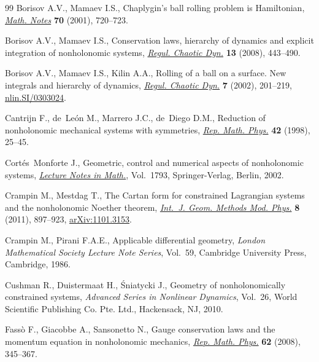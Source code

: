 \begin{thebibliography}{99}
Borisov A.V., Mamaev I.S., Chaplygin's ball rolling problem is {H}amiltonian,
  \href{http://dx.doi.org/10.1023/A:1012995330780}{\textit{Math. Notes}} \textbf{70} (2001), 720--723.

Borisov A.V., Mamaev I.S., Conservation laws, hierarchy of dynamics and
  explicit integration of nonholonomic systems, \href{http://dx.doi.org/10.1134/S1560354708050079}{\textit{Regul. Chaotic Dyn.}}
  \textbf{13} (2008), 443--490.

Borisov A.V., Mamaev I.S., Kilin A.A., Rolling of a ball on a surface. {N}ew
  integrals and hierarchy of dynamics, \href{http://dx.doi.org/10.1070/RD2002v007n02ABEH000205}{\textit{Regul. Chaotic Dyn.}} \textbf{7}
  (2002), 201--219, \href{http://arxiv.org/abs/nlin.SI/0303024}{nlin.SI/0303024}.

Cantrijn F., de~Le{\'o}n M., Marrero J.C., de~Diego D.M., Reduction of
  nonholonomic mechanical systems with symmetries, \href{http://dx.doi.org/10.1016/S0034-4877(98)80003-7}{\textit{Rep. Math. Phys.}}
  \textbf{42} (1998), 25--45.

Cort{\'e}s~Monforte J., Geometric, control and numerical aspects of
  nonholonomic systems, \href{http://dx.doi.org/10.1007/b84020}{\textit{Lecture Notes in Math.}}, Vol.~1793,
  Springer-Verlag, Berlin, 2002.

Crampin M., Mestdag T., The {C}artan form for constrained {L}agrangian systems
  and the nonholonomic {N}oether theorem, \href{http://dx.doi.org/10.1142/S0219887811005452}{\textit{Int.~J. Geom. Methods Mod.
  Phys.}} \textbf{8} (2011), 897--923, \href{http://arxiv.org/abs/1101.3153}{arXiv:1101.3153}.

Crampin M., Pirani F.A.E., Applicable dif\/ferential geometry, \textit{London
  Mathematical Society Lecture Note Series}, Vol.~59, Cambridge University
  Press, Cambridge, 1986.

Cushman R., Duistermaat H., {\'S}niatycki J., Geometry of nonholonomically
  constrained systems, \textit{Advanced Series in Nonlinear Dynamics}, Vol.~26,
  World Scientif\/ic Publishing Co. Pte. Ltd., Hackensack, NJ, 2010.

Fass{\`o} F., Giacobbe A., Sansonetto N., Gauge conservation laws and the
  momentum equation in nonholonomic mechanics, \href{http://dx.doi.org/10.1016/S0034-4877(09)00005-6}{\textit{Rep. Math. Phys.}}
  \textbf{62} (2008), 345--367.


\end{thebibliography}

